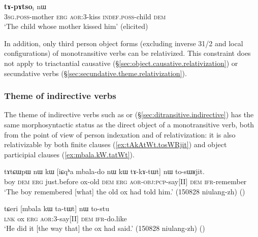 \begin{exe}
\ex \label{ex:Wmu.kW.kanWpoR}
\gll [ɯ$_i$-mu kɯ ka-nɯpoʁ] \textbf{tɤ-pɤtso}$_i$ nɯ \\
\textsc{3sg}.\textsc{poss}-mother \textsc{erg} \textsc{aor}:3\flobv{}-kiss \textsc{indef}.\textsc{poss}-child \textsc{dem} \\
\glt `The child whose mother kissed him' (elicited)
\end{exe}

In addition, only third person object forms (excluding inverse 3\fl{}1/2 and local configurations) of monotransitive verbs can be relativized. This constraint does not apply to triactantial causative (§\ref{sec:object.causative.relativization}) or secundative verbs (§\ref{sec:secundative.theme.relativization}).
\subsubsection{Theme of indirective verbs} \label{sec:indirective.relativization}
The theme of indirective verbs such as  or  (§\ref{sec:ditransitive.indirective}) has the same morphosyntactic status as the direct object of a monotransitive verb, both from the point of view of person indexation and of relativization: it is also relativizable by both finite clauses (\ref{ex:tAkAtWt.tosWRjit}) and object participial clauses (\ref{ex:mbala.kW.tatWt}).

\begin{exe}
\ex \label{ex:tAkAtWt.tosWRjit}
\gll tɤtɕɯpɯ nɯ kɯ [iɕqʰa mbala-do nɯ kɯ tɤ-kɤ-tɯt] nɯ to-sɯʁjit. \\
boy \textsc{dem} \textsc{erg} just.before ox-old \textsc{dem} \textsc{erg} \textsc{aor}-\textsc{obj}:\textsc{pcp}-say[II] \textsc{dem} \textsc{ifr}-remember \\
 \glt `The boy remembered [what] the old ox had told him.' (150828 niulang-zh)
()
 \end{exe}
 
 \begin{exe}
\ex \label{ex:mbala.kW.tatWt}
\gll tɕeri [mbala kɯ ta-tɯt] nɯ to-stu \\
\textsc{lnk} ox \textsc{erg} \textsc{aor}:3\flobv{}-say[II] \textsc{dem} \textsc{ifr}-do.like \\
\glt `He did it [the way that] the ox had said.' (150828 niulang-zh)
()
\end{exe} 

